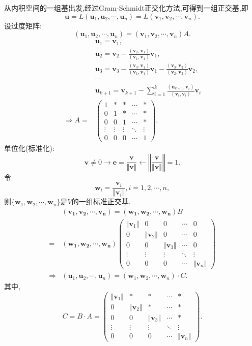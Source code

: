 \begin{notice}
  从内积空间的一组基出发,经过Gram-Schmidt正交化方法,可得到一组正交基,即
  \[
  \bm{u}=L(\bm{u}_1,\bm{u}_2,\cdots,\bm{u}_n) = 
  L(\bm{v}_1,\bm{v}_2,\cdots,\bm{v}_n).
  \]
  设过度矩阵:
  \[
  (\bm{u}_1,\bm{u}_2,\cdots,\bm{u}_n) = (\bm{v}_1,\bm{v}_2,\cdots,\bm{v}_n)A.
  \]
  \begin{align*}
    & \bm{u}_1 = \bm{v}_1,\\
    & \bm{u}_2 = \bm{v}_2-\frac{(\bm{v}_2,\bm{v}_1)}{(\bm{v}_1,\bm{v}_1)}\bm{v}_1,\\
    & \bm{u}_3 = \bm{v}_3-\frac{(\bm{v}_3,\bm{v}_1)}{(\bm{v}_1,\bm{v}_1)}\bm{v}_1
    -\frac{(\bm{v}_3,\bm{v}_2)}{(\bm{v}_2,\bm{v}_2)}\bm{v}_2,\\
    & \cdots\\
    & \bm{u}_{k+1} = \bm{v}_{k+1}-\sum_{i=1}^k\frac{(\bm{u}_{k+1},\bm{v}_i)}{(\bm{v}_i,\bm{v}_i)}\bm{v}_i\\
    \Longrightarrow A = & \begin{pmatrix}
      1 & * & * & \cdots & *\\
      0 & 1 & * & \cdots & *\\
      0 & 0 & 1 & \cdots & *\\
      \vdots & \vdots & \vdots & \ddots & \vdots\\
      0 & 0 & 0 & \cdots & 1
    \end{pmatrix}.
  \end{align*}
  单位化(标准化):
  \[
  \bm{v} \neq 0 \longrightarrow \bm{e} = \frac{\bm{v}}{\Vert\bm{v}\Vert} 
  \longleftarrow \left\Vert\frac{\bm{v}}{\Vert\bm{v}\Vert}\right\Vert = 1.
  \]
  令
  \[\bm{w}_i = \frac{\bm{v}_i}{\Vert\bm{v}_i\Vert}, i=1,2,\cdots,n,\]
  则$\{\bm{w}_1,\bm{w}_2,\cdots,\bm{w}_n\}$是$V$的一组标准正交基.
  \begin{align*}
    & (\bm{v_1},\bm{v_2},\cdots,\bm{v_n}) = (\bm{w_1},\bm{w_2},\cdots,\bm{w_n})B\\
    = & (\bm{w_1},\bm{w_2},\cdots,\bm{w_n})\begin{pmatrix}
      \Vert\bm{v}_1\Vert & 0 & 0 & \cdots & 0\\
      0 & \Vert\bm{v}_2\Vert & 0 & \cdots & 0\\
      0 & 0 & \Vert\bm{v}_3\Vert & \cdots & 0\\
      \vdots & \vdots & \vdots & \ddots & \vdots\\
      0 & 0 & 0 & \cdots & \Vert\bm{v}_n\Vert
    \end{pmatrix}\\
    \Longrightarrow & (\bm{u}_1,\bm{u}_2,\cdots,\bm{u}_n) = (\bm{w}_1,\bm{w}_2,\cdots,\bm{w}_n)\cdot C.
  \end{align*}
  其中,
  \[
  C = B\cdot A = \begin{pmatrix}
    \Vert\bm{v}_1\Vert & * & * & \cdots & *\\
    0 & \Vert\bm{v}_2\Vert & * & \cdots & *\\
    0 & 0 & \Vert\bm{v}_3\Vert & \cdots & *\\
    \vdots & \vdots & \vdots & \ddots & \vdots\\
    0 & 0 & 0 & \cdots & \Vert\bm{v}_n\Vert
  \end{pmatrix}.
  \]
\end{notice}

